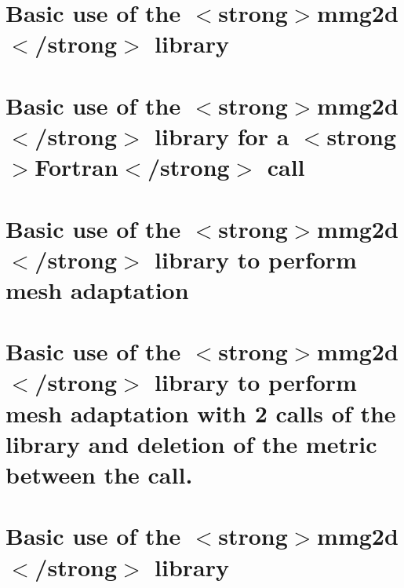 \documentclass[twoside]{book}
\newcommand{\+}{\discretionary{\mbox{\scriptsize$\hookleftarrow$}}{}{}}
\begin{document}
\chapter{Basic use of the \texorpdfstring{$<$}{<}strong\texorpdfstring{$>$}{>}mmg2d\texorpdfstring{$<$}{<}/strong\texorpdfstring{$>$}{>} library}
\label{md_libexamples_mmg2d_adaptation_example0_README}

\chapter{Basic use of the \texorpdfstring{$<$}{<}strong\texorpdfstring{$>$}{>}mmg2d\texorpdfstring{$<$}{<}/strong\texorpdfstring{$>$}{>} library for a \texorpdfstring{$<$}{<}strong\texorpdfstring{$>$}{>}Fortran\texorpdfstring{$<$}{<}/strong\texorpdfstring{$>$}{>} call}
\label{md_libexamples_mmg2d_adaptation_example0_fortran_README}

\chapter{Basic use of the \texorpdfstring{$<$}{<}strong\texorpdfstring{$>$}{>}mmg2d\texorpdfstring{$<$}{<}/strong\texorpdfstring{$>$}{>} library to perform mesh adaptation}
\label{md_libexamples_mmg2d_adaptation_example1_README}

\chapter{Basic use of the \texorpdfstring{$<$}{<}strong\texorpdfstring{$>$}{>}mmg2d\texorpdfstring{$<$}{<}/strong\texorpdfstring{$>$}{>} library to perform mesh adaptation with 2 calls of the library and deletion of the metric between the call.}
\label{md_libexamples_mmg2d_adaptation_example2_README}

\chapter{Basic use of the \texorpdfstring{$<$}{<}strong\texorpdfstring{$>$}{>}mmg2d\texorpdfstring{$<$}{<}/strong\texorpdfstring{$>$}{>} library}
\label{md_libexamples_mmg2d_adaptation_example3_README}

\end{document}
